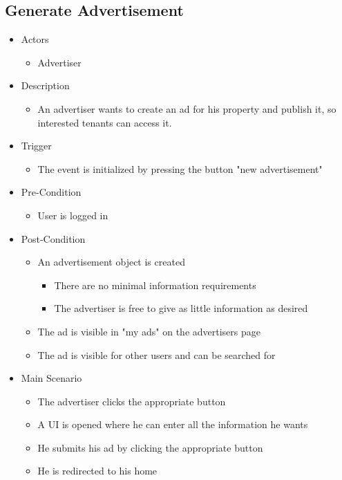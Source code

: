 \documentclass[a4paper,11pt]{article}
\begin{document}
\subsection*{Generate Advertisement}
\begin{itemize}
	\item Actors
		\begin{itemize}
			\item Advertiser
		\end{itemize}
	\item Description
		\begin{itemize}
			\item An advertiser wants to create an ad for his property and publish it, so interested tenants can access it.
		\end{itemize}
	\item Trigger
		\begin{itemize}
			\item The event is initialized by pressing the button "new advertisement"
		\end{itemize}
	\item Pre-Condition
		\begin{itemize}
			\item User is logged in
		\end{itemize}
	\item Post-Condition
		\begin{itemize}
			\item An advertisement object is created
				\begin{itemize}
					\item There are no minimal information requirements
					\item The advertiser is free to give as little information as desired
				\end{itemize}
			\item The ad is visible in "my ads" on the advertisers page
			\item The ad is visible for other users and can be searched for
		\end{itemize}
	\item Main Scenario
		\begin{itemize}
			\item The advertiser clicks the appropriate button
			\item A UI is opened where he can enter all the information he wants
			\item He submits his ad by clicking the appropriate button
			\item He is redirected to his home
		\end{itemize}
\end{itemize}
\end{document}
